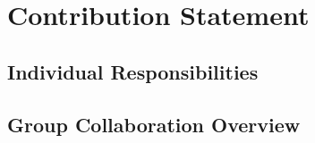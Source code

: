 \chapter{Contribution Statement}
\section{Individual Responsibilities}
\section{Group Collaboration Overview}
